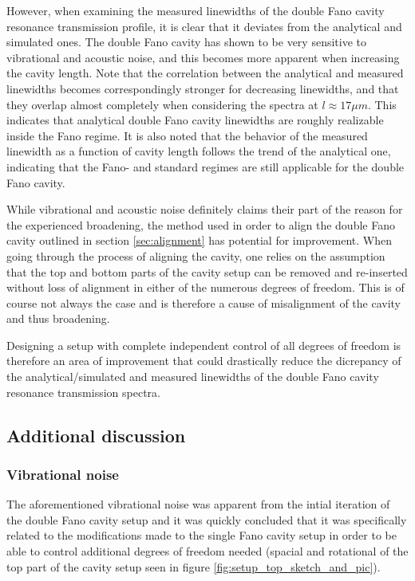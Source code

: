 However, when examining the measured linewidths of the double Fano cavity resonance transmission profile, it is clear that it deviates from the analytical and simulated ones. The double Fano cavity has shown to be very sensitive to vibrational and acoustic noise, and this becomes more apparent when increasing the cavity length. Note that the correlation between the analytical and measured linewidths becomes correspondingly stronger for decreasing linewidths, and that they overlap almost completely when considering the spectra at $l \approx 17 \mu m$. This indicates that analytical double Fano cavity linewidths are roughly realizable inside the Fano regime. It is also noted that the behavior of the measured linewidth as a function of cavity length follows the trend of the analytical one, indicating that the Fano- and standard regimes are still applicable for the double Fano cavity. 

While vibrational and acoustic noise definitely claims their part of the reason for the experienced broadening, the method used in order to align the double Fano cavity outlined in section \ref{sec:alignment} has potential for improvement. When going through the process of aligning the cavity, one relies on the assumption that the top and bottom parts of the cavity setup can be removed and re-inserted without loss of alignment in either of the numerous degrees of freedom. This is of course not always the case and is therefore a cause of misalignment of the cavity and thus broadening. 

Designing a setup with complete independent control of all degrees of freedom is therefore an area of improvement that could drastically reduce the dicrepancy of the analytical/simulated and measured linewidths of the double Fano cavity resonance transmission spectra.

\subsection{Additional discussion}

\subsubsection{Vibrational noise}

The aforementioned vibrational noise was apparent from the intial iteration of the double Fano cavity setup and it was quickly concluded that it was specifically related to the modifications made to the single Fano cavity setup in order to be able to control additional degrees of freedom needed (spacial and rotational of the top part of the cavity setup seen in figure \ref{fig:setup_top_sketch_and_pic}). 

